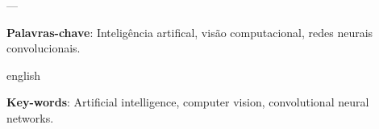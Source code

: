 \documentclass[
12pt,				    %
openright,			    %
oneside,			    %
a4paper,			    %
sumario=tradicional,    %
english,			    %
brazil,				    %
]{abntex2}              %
\begin{document}
	\frenchspacing
	
	\pretextual
	
	\imprimircapa
	
	\imprimirfolhaderosto
	
	
	
	
	---
	
	
	
	\begin{resumo}
		\noindent
		
		\vspace{\onelineskip}
		
		\noindent
		\textbf{Palavras-chave}: Inteligência artifical, visão computacional, redes neurais convolucionais.
	\end{resumo}
	
	\begin{resumo}[Abstract]
		\begin{otherlanguage*}{english}
			\noindent
			\vspace{\onelineskip}
			
			\noindent
			\textbf{Key-words}: Artificial intelligence, computer vision, convolutional neural networks.
		\end{otherlanguage*}
	\end{resumo}
	
\end{document}
